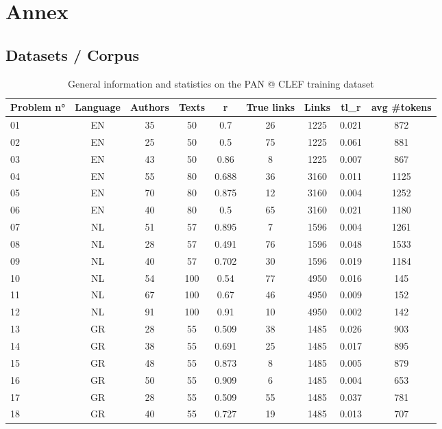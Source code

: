 \section*{Annex \label{sec:annex}}

\subsection*{Datasets / Corpus}

\begin{table*}[h]
  \caption{General information and statistics on the PAN @ CLEF training dataset}
  \label{tab:pan_datasets}
  \begin{tabular}{l c c c c c c c c}
    \toprule
    \textbf{Problem n°} &
    \textbf{Language} &
    \textbf{Authors} &
    \textbf{Texts} &
    \textbf{r} &
    \textbf{True links} &
    \textbf{Links} &
    \textbf{tl\_r} &
    \textbf{avg \#tokens} \\
    \midrule
    01 & EN & 35 & 50 & 0.7 & 26 & 1225 & 0.021 & 872 \\
    02 & EN & 25 & 50 & 0.5 & 75 & 1225 & 0.061 & 881 \\
    03 & EN & 43 & 50 & 0.86 & 8 & 1225 & 0.007 & 867 \\
    04 & EN & 55 & 80 & 0.688 & 36 & 3160 & 0.011 & 1125 \\
    05 & EN & 70 & 80 & 0.875 & 12 & 3160 & 0.004 & 1252 \\
    06 & EN & 40 & 80 & 0.5 & 65 & 3160 & 0.021 & 1180 \\
    07 & NL & 51 & 57 & 0.895 & 7 & 1596 & 0.004 & 1261 \\
    08 & NL & 28 & 57 & 0.491 & 76 & 1596 & 0.048 & 1533 \\
    09 & NL & 40 & 57 & 0.702 & 30 & 1596 & 0.019 & 1184 \\
    10 & NL & 54 & 100 & 0.54 & 77 & 4950 & 0.016 & 145 \\
    11 & NL & 67 & 100 & 0.67 & 46 & 4950 & 0.009 & 152 \\
    12 & NL & 91 & 100 & 0.91 & 10 & 4950 & 0.002 & 142 \\
    13 & GR & 28 & 55 & 0.509 & 38 & 1485 & 0.026 & 903 \\
    14 & GR & 38 & 55 & 0.691 & 25 & 1485 & 0.017 & 895 \\
    15 & GR & 48 & 55 & 0.873 & 8 & 1485 & 0.005 & 879 \\
    16 & GR & 50 & 55 & 0.909 & 6 & 1485 & 0.004 & 653 \\
    17 & GR & 28 & 55 & 0.509 & 55 & 1485 & 0.037 & 781 \\
    18 & GR & 40 & 55 & 0.727 & 19 & 1485 & 0.013 & 707 \\
    \bottomrule
  \end{tabular}
\end{table*}

